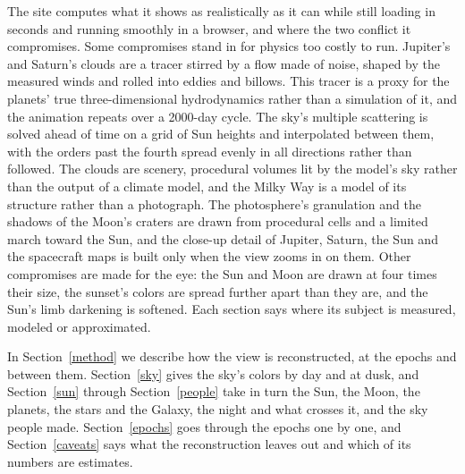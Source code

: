 \documentclass[9pt,twocolumn]{extarticle}
\begin{document}
The site computes what it shows as realistically as it can while still loading in seconds and running smoothly in a browser, and where the two conflict it compromises. Some compromises stand in for physics too costly to run. Jupiter's and Saturn's clouds are a tracer stirred by a flow made of noise, shaped by the measured winds and rolled into eddies and billows. This tracer is a proxy for the planets' true three-dimensional hydrodynamics rather than a simulation of it, and the animation repeats over a 2000-day cycle. The sky's multiple scattering is solved ahead of time on a grid of Sun heights and interpolated between them, with the orders past the fourth spread evenly in all directions rather than followed. The clouds are scenery, procedural volumes lit by the model's sky rather than the output of a climate model, and the Milky Way is a model of its structure rather than a photograph. The photosphere's granulation and the shadows of the Moon's craters are drawn from procedural cells and a limited march toward the Sun, and the close-up detail of Jupiter, Saturn, the Sun and the spacecraft maps is built only when the view zooms in on them. Other compromises are made for the eye: the Sun and Moon are drawn at four times their size, the sunset's colors are spread further apart than they are, and the Sun's limb darkening is softened. Each section says where its subject is measured, modeled or approximated.

In Section~\ref{method} we describe how the view is reconstructed, at the epochs and between them. Section~\ref{sky} gives the sky's colors by day and at dusk, and Section~\ref{sun} through Section~\ref{people} take in turn the Sun, the Moon, the planets, the stars and the Galaxy, the night and what crosses it, and the sky people made. Section~\ref{epochs} goes through the epochs one by one, and Section~\ref{caveats} says what the reconstruction leaves out and which of its numbers are estimates.
\end{document}
